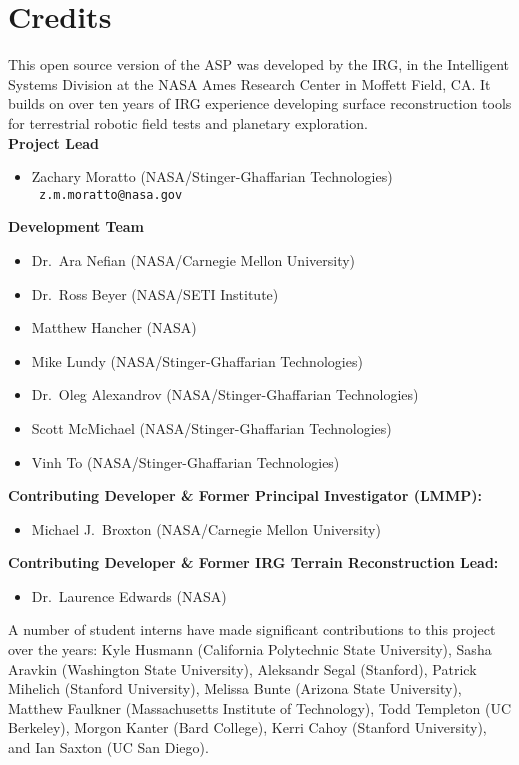 
\chapter*{Credits}

This open source version of the \ac{ASP} was developed by the
\ac{IRG}, in the Intelligent Systems Division at the \ac{NASA} Ames
Research Center in Moffett Field, CA. It builds on over ten years
of IRG experience developing surface reconstruction tools for
terrestrial robotic field tests and planetary exploration. \\

{\bf Project Lead}
\begin {itemize}
\item Zachary Moratto (NASA/Stinger-Ghaffarian Technologies)\\ {\tt
  z.m.moratto@nasa.gov}
\end{itemize}

{\bf Development Team}
\begin{itemize}
\item Dr.~Ara Nefian (NASA/Carnegie Mellon University)
\item Dr.~Ross Beyer (NASA/SETI Institute)
\item Matthew Hancher (NASA)
\item Mike Lundy (NASA/Stinger-Ghaffarian Technologies)
\item Dr.~Oleg Alexandrov (NASA/Stinger-Ghaffarian Technologies)
\item Scott McMichael (NASA/Stinger-Ghaffarian Technologies)
\item Vinh To (NASA/Stinger-Ghaffarian Technologies)
\end{itemize}

{\bf Contributing Developer \& Former Principal Investigator (LMMP):}
\begin{itemize}
\item Michael J.~Broxton (NASA/Carnegie Mellon University)
\end{itemize}

{\bf Contributing Developer \& Former IRG Terrain Reconstruction Lead:}
\begin{itemize}
\item Dr.\ Laurence Edwards (NASA)
\end{itemize}

A number of student interns have made significant contributions to
this project over the years: Kyle Husmann (California Polytechnic
State University), Sasha Aravkin (Washington State University),
Aleksandr Segal (Stanford), Patrick Mihelich (Stanford University),
Melissa Bunte (Arizona State University), Matthew Faulkner
(Massachusetts Institute of Technology), Todd Templeton (UC Berkeley),
Morgon Kanter (Bard College), Kerri Cahoy (Stanford University), and
Ian Saxton (UC San Diego).


